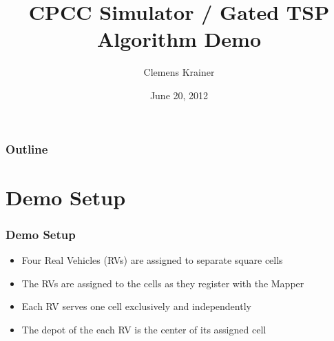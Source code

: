 \documentclass{beamer}
\title{CPCC Simulator / Gated TSP Algorithm Demo}
\author{Clemens Krainer}
\institute[University of Salzburg]
{
Department of Computer Sciences\\
University of Salzburg, Austria
}
\date{June 20, 2012}
\begin{document}
\begin{frame}
        \titlepage
\end{frame}

\begin{frame}
        \frametitle{Outline}
        \tableofcontents
\end{frame}


\section{Demo Setup}


\begin{frame}\frametitle{Demo Setup} %
% 
% 

  \begin{itemize}
    \item Four Real Vehicles (RVs) are assigned to separate square cells
    \item The RVs are assigned to the cells as they register with the Mapper 
    \item Each RV serves one cell exclusively and independently
    \item The depot of the each RV is the center of its assigned cell
  \end{itemize}

\end{frame}
\end{document}
